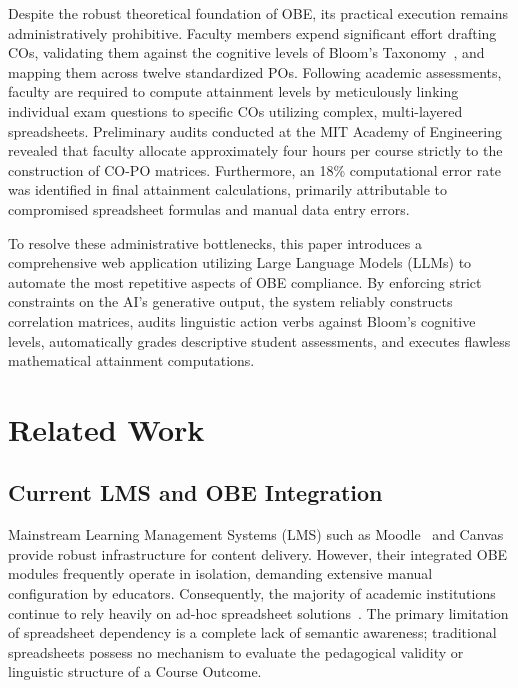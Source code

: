 \documentclass[conference]{IEEEtran}
\begin{document}
Despite the robust theoretical foundation of OBE, its practical execution remains administratively prohibitive. Faculty members expend significant effort drafting COs, validating them against the cognitive levels of Bloom's Taxonomy~\cite{bloom1956, anderson2001}, and mapping them across twelve standardized POs. Following academic assessments, faculty are required to compute attainment levels by meticulously linking individual exam questions to specific COs utilizing complex, multi-layered spreadsheets. Preliminary audits conducted at the MIT Academy of Engineering revealed that faculty allocate approximately four hours per course strictly to the construction of CO-PO matrices. Furthermore, an 18\% computational error rate was identified in final attainment calculations, primarily attributable to compromised spreadsheet formulas and manual data entry errors.

To resolve these administrative bottlenecks, this paper introduces a comprehensive web application utilizing Large Language Models (LLMs) to automate the most repetitive aspects of OBE compliance. By enforcing strict constraints on the AI's generative output, the system reliably constructs correlation matrices, audits linguistic action verbs against Bloom's cognitive levels, automatically grades descriptive student assessments, and executes flawless mathematical attainment computations.

\section{Related Work}

\subsection{Current LMS and OBE Integration}
Mainstream Learning Management Systems (LMS) such as Moodle~\cite{dougiamas2003} and Canvas provide robust infrastructure for content delivery. However, their integrated OBE modules frequently operate in isolation, demanding extensive manual configuration by educators. Consequently, the majority of academic institutions continue to rely heavily on ad-hoc spreadsheet solutions~\cite{nba2017, kothari2004}. The primary limitation of spreadsheet dependency is a complete lack of semantic awareness; traditional spreadsheets possess no mechanism to evaluate the pedagogical validity or linguistic structure of a Course Outcome.
\end{document}
